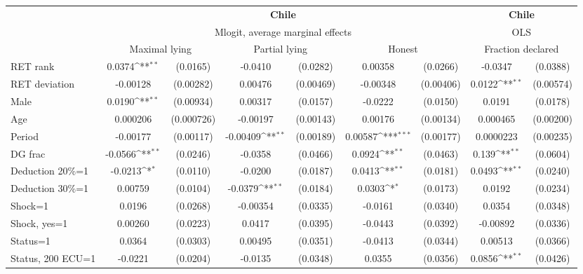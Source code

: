 \def\sym#1{\ifmmode^{#1}\else\(^{#1}\)\fi}
\begin{tabular}{l|cccccc|cc}
\hline\hline
&\multicolumn{6}{c|}{\bf Chile}&\multicolumn{2}{c}{\bf Chile}\\ &\multicolumn{6}{c|}{Mlogit, average marginal effects }&\multicolumn{2}{c}{OLS}\\
                &\multicolumn{2}{c}{Maximal lying}&\multicolumn{2}{c}{Partial lying}&\multicolumn{2}{c}{Honest}  &\multicolumn{2}{c}{Fraction declared}\\
\hline
RET rank        &   0.0374\sym{**} & (0.0165)&  -0.0410         & (0.0282)&  0.00358         & (0.0266)&  -0.0347         & (0.0388)\\
RET deviation   & -0.00128         &(0.00282)&  0.00476         &(0.00469)& -0.00348         &(0.00406)&   0.0122\sym{**} &(0.00574)\\
Male            &   0.0190\sym{**} &(0.00934)&  0.00317         & (0.0157)&  -0.0222         & (0.0150)&   0.0191         & (0.0178)\\
Age             & 0.000206         &(0.000726)& -0.00197         &(0.00143)&  0.00176         &(0.00134)& 0.000465         &(0.00200)\\
Period          & -0.00177         &(0.00117)& -0.00409\sym{**} &(0.00189)&  0.00587\sym{***}&(0.00177)&0.0000223         &(0.00235)\\
DG frac         &  -0.0566\sym{**} & (0.0246)&  -0.0358         & (0.0466)&   0.0924\sym{**} & (0.0463)&    0.139\sym{**} & (0.0604)\\
Deduction 20\%=1&  -0.0213\sym{*}  & (0.0110)&  -0.0200         & (0.0187)&   0.0413\sym{**} & (0.0181)&   0.0493\sym{**} & (0.0240)\\
Deduction 30\%=1&  0.00759         & (0.0104)&  -0.0379\sym{**} & (0.0184)&   0.0303\sym{*}  & (0.0173)&   0.0192         & (0.0234)\\
Shock=1         &   0.0196         & (0.0268)& -0.00354         & (0.0335)&  -0.0161         & (0.0340)&   0.0354         & (0.0348)\\
Shock, yes=1    &  0.00260         & (0.0223)&   0.0417         & (0.0395)&  -0.0443         & (0.0392)& -0.00892         & (0.0336)\\
Status=1        &   0.0364         & (0.0303)&  0.00495         & (0.0351)&  -0.0413         & (0.0344)&  0.00513         & (0.0366)\\
Status, 200 ECU=1&  -0.0221         & (0.0204)&  -0.0135         & (0.0348)&   0.0355         & (0.0356)&   0.0856\sym{**} & (0.0426)\\

\end{tabular}
